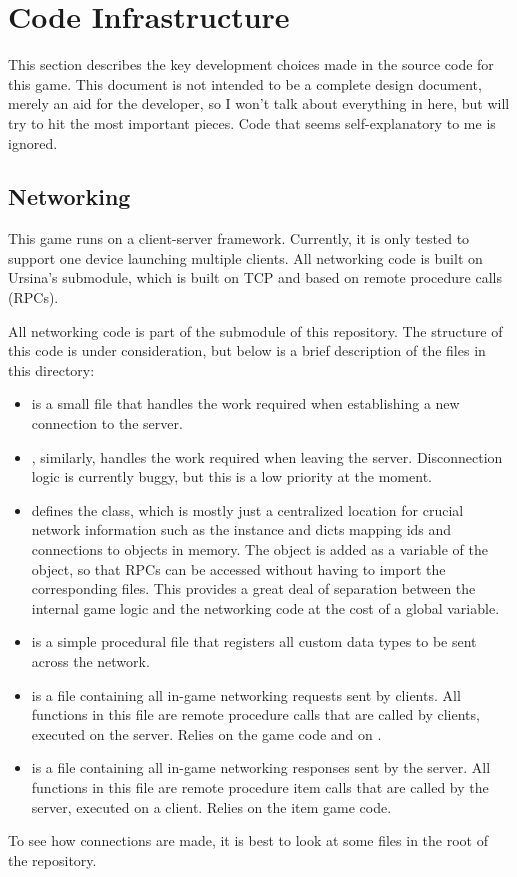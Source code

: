 \documentclass{article}
\begin{document}
\section{Code Infrastructure}
This section describes the key development choices made in the source code
for this game. This document is not intended to be a complete design
document, merely an aid for the developer, so I won't talk about everything
in here, but will try to hit the most important pieces. Code that seems
self-explanatory to me is ignored.
\subsection{Networking}
This game runs on a client-server framework. Currently, it is only tested to
support one device launching multiple clients.
All networking code is built on Ursina's
 submodule, which is built on TCP and based on remote
procedure calls (RPCs).

All networking code is part of the  submodule of this
repository. The structure of this code is under consideration, but below is a
brief description of the files in this directory:
\begin{itemize}
    \item {} is a small file that handles the work required
        when establishing a new connection to the server.
    \item {}, similarly, handles the work required when
        leaving the server. Disconnection logic is currently buggy, but this
        is a low priority at the moment.
    \item {} defines the  class, which is
        mostly just a centralized location for crucial network information
        such as the  instance and dicts mapping ids and connections
        to objects in memory. The  object is added as a
        variable of the  object, so that RPCs can be accessed
        without having to import the corresponding files. This provides a great
        deal of separation between the internal game logic and the networking
        code at the cost of a global variable.
    \item {} is a simple procedural file that registers all
        custom data types to be sent across the network.
    \item {} is a file containing all in-game networking
        requests sent by clients. All functions in this file are remote procedure
        calls that are called by clients, executed on the server. Relies on the
        game code and on .
    \item {} is a file containing all in-game networking
        responses sent by the server. All functions in this file are remote procedure
        item calls that are called by the server, executed on a client. Relies on the
        item game code.
\end{itemize}
To see how connections are made, it is best to look at some files in the root of the
repository.
\end{document}
